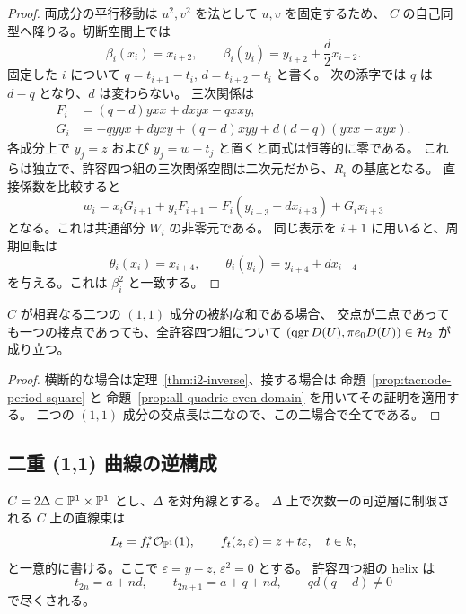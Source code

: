 \begin{proof}
両成分の平行移動は $u^2,v^2$ を法として $u,v$ を固定するため、
$C$ の自己同型へ降りる。切断空間上では
\[
 \beta_i(x_i)=x_{i+2},\qquad
 \beta_i(y_i)=y_{i+2}+\frac d2x_{i+2}.
\]
固定した $i$ について $q=t_{i+1}-t_i$, $d=t_{i+2}-t_i$ と書く。
次の添字では $q$ は $d-q$ となり、$d$ は変わらない。
三次関係は
\begin{align*}
 F_i&=(q-d)yxx+dxyx-qxxy,\\
 G_i&=-qyyx+dyxy+(q-d)xyy
       +d(d-q)(yxx-xyx).
\end{align*}
各成分上で $y_j=z$ および $y_j=w-t_j$ と置くと両式は恒等的に零である。
これらは独立で、許容四つ組の三次関係空間は二次元だから、$R_i$ の基底となる。
直接係数を比較すると
\[
 w_i=x_iG_{i+1}+y_iF_{i+1}
    =F_i(y_{i+3}+dx_{i+3})+G_ix_{i+3}
\]
となる。これは共通部分 $W_i$ の非零元である。
同じ表示を $i+1$ に用いると、周期回転は
\[
 \theta_i(x_i)=x_{i+4},\qquad
 \theta_i(y_i)=y_{i+4}+d x_{i+4}
\]
を与える。これは $\beta_i^2$ と一致する。
\end{proof}

\begin{theorem}
\label{thm:reduced-11-11-inverse}
$C$ が相異なる二つの $(1,1)$ 成分の被約な和である場合、
交点が二点であっても一つの接点であっても、全許容四つ組について
$(\operatorname{qgr} D(U),\pi e_0D(U))\in\mathcal H_2$ が成り立つ。
\end{theorem}

\begin{proof}
横断的な場合は定理~\ref{thm:i2-inverse}、接する場合は
命題~\ref{prop:tacnode-period-square} と
命題~\ref{prop:all-quadric-even-domain} を用いてその証明を適用する。
二つの $(1,1)$ 成分の交点長は二なので、この二場合で全てである。
\end{proof}

\subsection{二重 (1,1) 曲線の逆構成}

\begin{proposition}[二重対角線の直線束と許容四つ組]
\label{prop:ribbon-quadruples}
$C=2\Delta\subset\mathbb P^1\times\mathbb P^1$ とし、$\Delta$ を対角線とする。
$\Delta$ 上で次数一の可逆層に制限される $C$ 上の直線束は
\[
 L_t=f_t^*\mathcal O_{\mathbb P^1}(1),\qquad
 f_t(z,\varepsilon)=z+t\varepsilon,\quad t\in k,
\]
と一意的に書ける。ここで $\varepsilon=y-z$, $\varepsilon^2=0$ とする。
許容四つ組の helix は
\[
 t_{2n}=a+nd,\qquad t_{2n+1}=a+q+nd,
 \qquad qd(q-d)\ne0
\]
で尽くされる。
\end{proposition}

